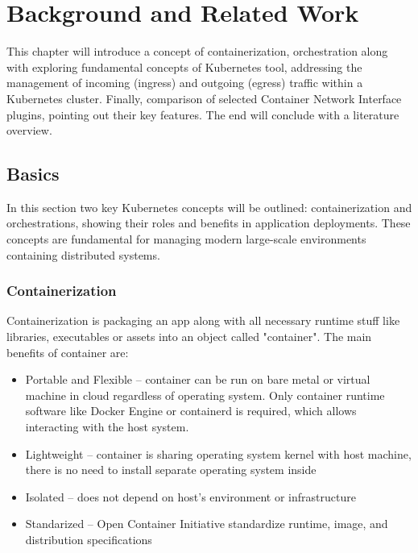 \chapter{Background and Related Work}
\label{cha:background}

This chapter will introduce a concept of containerization, orchestration along with exploring fundamental concepts of Kubernetes tool, addressing the management of incoming (ingress) and outgoing (egress) traffic within a Kubernetes cluster. Finally, comparison of selected Container Network Interface plugins, pointing out their key features. The end will conclude with a literature overview.


\section{Basics}
\label{sec:basics}

In this section two key Kubernetes concepts will be outlined: containerization and orchestrations, showing their roles and benefits in application deployments. These concepts are fundamental for managing modern large-scale environments containing distributed systems.

\subsection{Containerization}
\label{sec:containerization}

Containerization is packaging an app along with all necessary runtime stuff like libraries, executables or assets into an object called "container". The main benefits of container are\cite{RedhatContainerization}: 

\begin{itemize} 
    \item Portable and Flexible -- container can be run on bare metal or virtual machine in cloud regardless of operating system. Only container runtime software like Docker Engine or containerd is required, which allows interacting with the host system. 

    \item Lightweight -- container is sharing operating system kernel with host machine, there is no need to install separate operating system inside 

    \item Isolated -- does not depend on host's environment or infrastructure 

    \item Standarized -- Open Container Initiative standardize runtime, image, and distribution specifications 

\end{itemize} 

